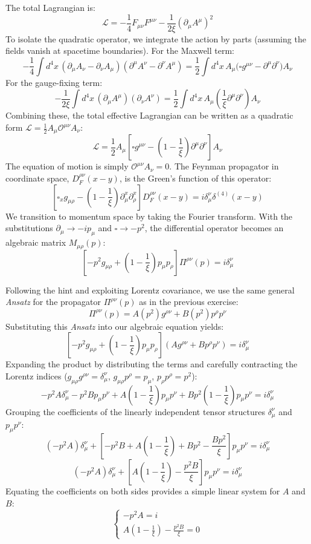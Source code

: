 The total Lagrangian is:
\[
    \mathcal{L} = -\frac{1}{4}F_{\mu\nu}F^{\mu\nu} - \frac{1}{2\xi}(\partial_\mu A^\mu)^2
\]
To isolate the quadratic operator, we integrate the action by parts (assuming the fields vanish at spacetime boundaries). For the Maxwell term:
\[
    -\frac{1}{4} \int d^4x \, (\partial_\mu A_\nu - \partial_\nu A_\mu)(\partial^\mu A^\nu - \partial^\nu A^\mu) = \frac{1}{2} \int d^4x \, A_\mu \big( \square g^{\mu\nu} - \partial^\mu \partial^\nu \big) A_\nu
\]
For the gauge-fixing term:
\[
    -\frac{1}{2\xi} \int d^4x \, (\partial_\mu A^\mu)(\partial_\nu A^\nu) = \frac{1}{2} \int d^4x \, A_\mu \left( \frac{1}{\xi} \partial^\mu \partial^\nu \right) A_\nu
\]
Combining these, the total effective Lagrangian can be written as a quadratic form $\mathcal{L} = \frac{1}{2} A_\mu \mathcal{O}^{\mu\nu} A_\nu$:
\[
    \mathcal{L} = \frac{1}{2} A_\mu \left[ \square g^{\mu\nu} - \left( 1 - \frac{1}{\xi} \right) \partial^\mu \partial^\nu \right] A_\nu
\]
The equation of motion is simply $\mathcal{O}^{\mu\nu} A_\nu = 0$. The Feynman propagator in coordinate space, $D_F^{\rho\nu}(x-y)$, is the Green's function of this operator:
\[
    \left[ \square_x g_{\mu\rho} - \left( 1 - \frac{1}{\xi} \right) \partial^x_\mu \partial^x_\rho \right] D_F^{\rho\nu}(x-y) = i \delta_\mu^\nu \delta^{(4)}(x-y)
\]
We transition to momentum space by taking the Fourier transform. With the substitutions $\partial_\mu \to -ip_\mu$ and $\square \to -p^2$, the differential operator becomes an algebraic matrix $M_{\mu\rho}(p)$:
\[
    \left[ -p^2 g_{\mu\rho} + \left( 1 - \frac{1}{\xi} \right) p_\mu p_\rho \right] \Pi^{\rho\nu}(p) = i \delta_\mu^\nu
\]

Following the hint and exploiting Lorentz covariance, we use the same general \textit{Ansatz} for the propagator $\Pi^{\rho\nu}(p)$ as in the previous exercise:
\[
    \Pi^{\rho\nu}(p) = A(p^2) g^{\rho\nu} + B(p^2) p^\rho p^\nu
\]
Substituting this \textit{Ansatz} into our algebraic equation yields:
\[
    \left[ -p^2 g_{\mu\rho} + \left( 1 - \frac{1}{\xi} \right) p_\mu p_\rho \right] \left( A g^{\rho\nu} + B p^\rho p^\nu \right) = i \delta_\mu^\nu
\]
Expanding the product by distributing the terms and carefully contracting the Lorentz indices ($g_{\mu\rho} g^{\rho\nu} = \delta_\mu^\nu$, $g_{\mu\rho} p^\rho = p_\mu$, $p_\rho p^\rho = p^2$):
\[
    -p^2 A \delta_\mu^\nu - p^2 B p_\mu p^\nu + A \left( 1 - \frac{1}{\xi} \right) p_\mu p^\nu + B p^2 \left( 1 - \frac{1}{\xi} \right) p_\mu p^\nu = i \delta_\mu^\nu
\]
Grouping the coefficients of the linearly independent tensor structures $\delta_\mu^\nu$ and $p_\mu p^\nu$:
\[
    (-p^2 A) \delta_\mu^\nu + \left[ -p^2 B + A \left( 1 - \frac{1}{\xi} \right) + B p^2 - \frac{B p^2}{\xi} \right] p_\mu p^\nu = i \delta_\mu^\nu
\]
\[
    (-p^2 A) \delta_\mu^\nu + \left[ A \left( 1 - \frac{1}{\xi} \right) - \frac{p^2 B}{\xi} \right] p_\mu p^\nu = i \delta_\mu^\nu
\]
Equating the coefficients on both sides provides a simple linear system for $A$ and $B$:
\[
    \begin{cases}
        -p^2 A = i \\
        A \left( 1 - \frac{1}{\xi} \right) - \frac{p^2 B}{\xi} = 0
    \end{cases}
\]

